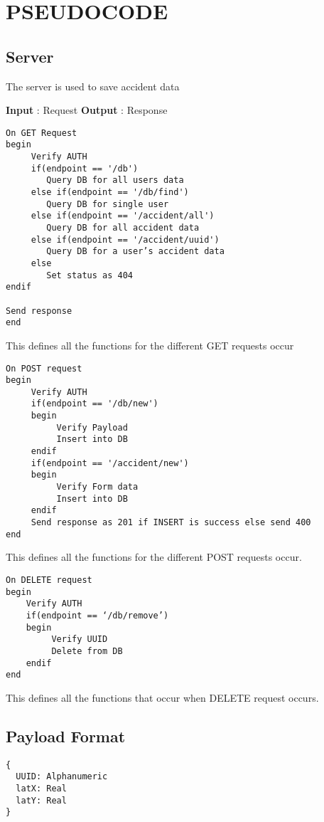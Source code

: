 \chapter{PSEUDOCODE} %

\section{Server}

The server is used to save accident data

\noindent\textbf{Input} : Request \newline
\textbf{Output} : Response

\begin{verbatim}
On GET Request
begin
     Verify AUTH
     if(endpoint == '/db')
        Query DB for all users data
     else if(endpoint == '/db/find')
        Query DB for single user
     else if(endpoint == '/accident/all')
        Query DB for all accident data
     else if(endpoint == '/accident/uuid')
        Query DB for a user’s accident data
     else
        Set status as 404
endif

Send response
end
\end{verbatim}

This defines all the functions for the different GET requests occur

\begin{verbatim}
On POST request
begin
     Verify AUTH
     if(endpoint == '/db/new')
     begin
          Verify Payload
          Insert into DB
     endif
     if(endpoint == '/accident/new')
     begin
          Verify Form data
          Insert into DB
     endif
     Send response as 201 if INSERT is success else send 400
end	
\end{verbatim}

This defines all the functions for the different POST requests occur.

\begin{verbatim}
On DELETE request
begin 
    Verify AUTH
    if(endpoint == ‘/db/remove’)
    begin
         Verify UUID
         Delete from DB
    endif
end
\end{verbatim}

This defines all the functions that occur when DELETE request occurs.

\section{Payload Format}
\label{sub:payload}
\begin{verbatim}
{
  UUID: Alphanumeric
  latX: Real
  latY: Real
}
\end{verbatim}